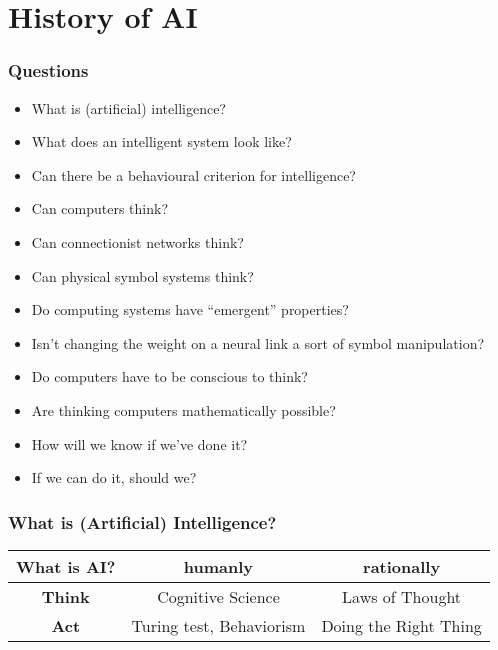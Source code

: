 \documentclass[UTF8,11pt,colorlinks,compress,openany]{beamer}%
\begin{document}
\section{History of AI}

\begin{frame}\frametitle{Questions}
\begin{itemize}
	\item What is (artificial) intelligence?
	\item What does an intelligent system look like?
	\item Can there be a behavioural criterion for intelligence?
	\item Can computers think?
	\item Can connectionist networks think?
	\item Can physical symbol systems think?
	\item Do computing systems have ``emergent'' properties?
	\item Isn't changing the weight on a neural
link a sort of symbol manipulation?
	\item Do computers have to be conscious to think?
	\item Are thinking computers mathematically possible?
	\item How will we know if we've done it?
	\item If we can do it, should we?
\end{itemize}
\end{frame}

\begin{frame}\frametitle{What is (Artificial) Intelligence?}
\begin{table}
\begin{tabu}{c|c|c}
\hline
\textbf{What is AI?} &\textbf{humanly} &\textbf{rationally}\\
\hline
\textbf{Think} &Cognitive Science &Laws of Thought\\
\hline
\textbf{Act} &Turing test, Behaviorism &Doing the Right Thing\\
\hline
\end{tabu}
\end{table}
\end{frame}
\end{document}
